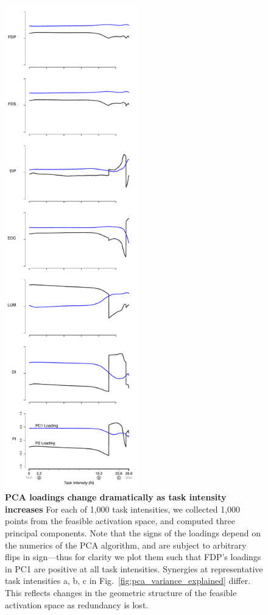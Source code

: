 \documentclass[9pt,twocolumn,twoside,lineno]{pnas-new}
\begin{document}
\begin{figure}[htbp]
\centering
\includegraphics[height=21cm]{supplemental_figures/pc_loadings_FDP_made_positive.pdf}
\caption{\textbf{PCA loadings change dramatically as task intensity increases} For each of 1,000 task intensities, we collected 1,000 points from the feasible activation space, and computed three principal components.
Note that the signs of the loadings depend on the numerics of the PCA algorithm, and are subject to arbitrary flips in sign---thus for clarity we plot them such that FDP's loadings in PC1 are positive at all task intensities.
Synergies at representative task intensities a, b, c in Fig.~\ref{fig:pca_variance_explained} differ. This reflects changes in the geometric structure of the feasible activation space as redundancy is lost.}
\label{fig:pca_loadings_detail}
\end{figure}
\end{document}
